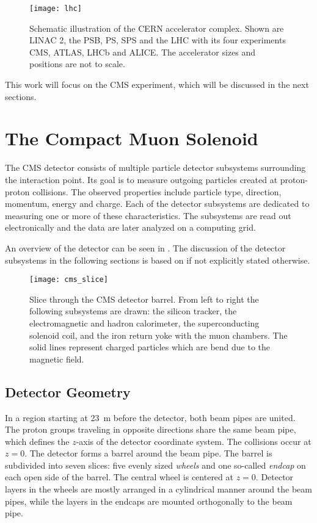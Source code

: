 \begin{figure}
    \centering
    \texttt{[image: lhc]}
    \caption{Schematic illustration of the \acs{CERN} accelerator complex. Shown are \ac{LINAC} 2, the \ac{PSB}, \ac{PS}, \ac{SPS} and the LHC with its four experiments \acs{CMS}, \acs{ATLAS}, \acs{LHCb} and \acs{ALICE}. The accelerator sizes and positions are not to scale\cite{Ley:CERNAccelerators,Caron:LHCLayout
    ,DeMelis:CERNacceleratorcomplex}.}
    \label{fig:LHC}
\end{figure}

This work will focus on the \ac{CMS} experiment, which will be discussed in the next sections.

\section{The Compact Muon Solenoid}
The \ac{CMS} detector consists of multiple particle detector subsystems surrounding the interaction point.
Its goal is to measure outgoing particles created at proton-proton collisions.
The observed properties include particle type, direction, momentum, energy and charge. Each of the detector subsystems are dedicated to measuring one or more of these characteristics. The subsystems are read out electronically and the data are later analyzed on a computing grid.

An overview of the detector can be seen in . The discussion of the detector subsystems in the following sections is based on \cite{Chatrchyan:CMSexperimentCERN} if not explicitly stated otherwise.

\begin{figure}
    \centering
    \hspace{0.02\textwidth}
    \texttt{[image: cms\_slice]}
    \caption{Slice through the CMS detector barrel. From left to right the following subsystems are drawn: the silicon tracker, the electromagnetic and hadron calorimeter, the superconducting solenoid coil, and the iron return yoke with the muon chambers. The solid lines represent charged particles which are bend due to the magnetic field\cite[modified]{Davis:CMSSlice}.}
    \label{fig:CMS_slice}
\end{figure}

\subsection{Detector Geometry}
In a region starting at \SI{23}{\m} before the detector, both beam pipes are united\cite{Evans:LHCMachine}. The proton groups traveling in opposite directions share the same beam pipe, which defines the $z$-axis of the detector coordinate system. The collisions occur at $z = 0$.
The detector forms a barrel around the beam pipe. The barrel is subdivided into seven slices: five evenly sized \emph{wheels} and one so-called \emph{endcap} on each open side of the barrel. The central wheel is centered at $z = 0$.
Detector layers in the wheels are mostly arranged in a cylindrical manner around the beam pipes, while the layers in the endcaps are mounted orthogonally to the beam pipe.

